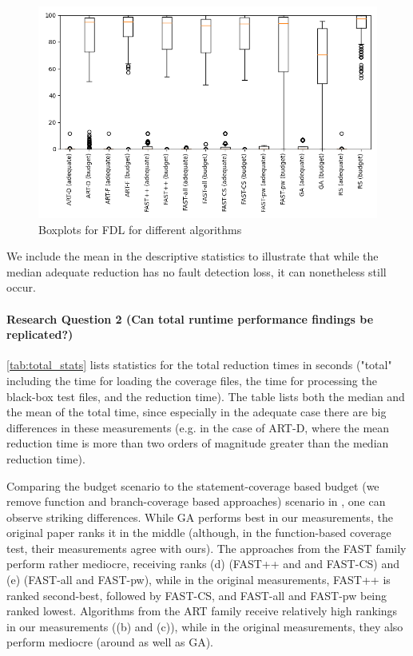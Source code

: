 \begin{figure}[h]
\caption[FDL boxplots]{Boxplots for FDL for different algorithms}\label{fig:fdl_box}
\centering
\includegraphics[scale=0.7]{figures/fdls.png}
\end{figure}

We include the mean in the descriptive statistics to illustrate that
while the median adequate reduction has no fault detection loss, it can
nonetheless still occur.

\paragraph{Research Question 2 (Can total runtime performance findings be replicated?)}

\autoref{tab:total_stats} lists statistics for the total reduction times
in seconds ("total" including the time for loading the coverage files,
the time for processing the black-box test files, and the reduction
time). The table lists both the median and the mean of the total time,
since especially in the adequate case there are big differences in these
measurements (e.g. in the case of ART-D, where the mean reduction time is
more than two orders of magnitude greater than the median reduction time).

Comparing the budget scenario to the statement-coverage based budget
(we remove function and branch-coverage based approaches) scenario in
\cite{cruciani2019scalable}, one can observe striking differences. While
GA performs best in our measurements, the original paper ranks it
in the middle (although, in the function-based coverage test, their
measurements agree with ours). The approaches from the FAST family perform
rather mediocre, receiving ranks (d) (FAST++ and and FAST-CS) and (e)
(FAST-all and FAST-pw), while in the original measurements, FAST++
is ranked second-best, followed by FAST-CS, and FAST-all and FAST-pw
being ranked lowest. Algorithms from the ART family receive relatively
high rankings in our measurements ((b) and (c)), while in the original
measurements, they also perform mediocre (around as well as GA).

